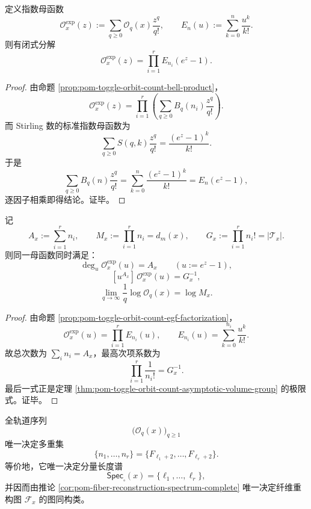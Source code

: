 \begin{proposition}[轨道指数母函数的截断指数分解]\label{prop:pom-toggle-orbit-count-egf-factorization}
定义指数母函数
\[
\mathcal O_x^{\exp}(z):=\sum_{q\ge 0}\mathcal O_q(x)\frac{z^q}{q!},
\qquad
E_n(u):=\sum_{k=0}^{n}\frac{u^k}{k!}.
\]
则有闭式分解
\[
\mathcal O_x^{\exp}(z)=\prod_{i=1}^r E_{n_i}(e^z-1).
\]
\end{proposition}

\begin{proof}
由命题 \ref{prop:pom-toggle-orbit-count-bell-product}，
\[
\mathcal O_x^{\exp}(z)
=
\prod_{i=1}^r\left(\sum_{q\ge 0}B_q(n_i)\frac{z^q}{q!}\right).
\]
而 Stirling 数的标准指数母函数为
\[
\sum_{q\ge 0}S(q,k)\frac{z^q}{q!}=\frac{(e^z-1)^k}{k!}.
\]
于是
\[
\sum_{q\ge 0}B_q(n)\frac{z^q}{q!}
=
\sum_{k=0}^{n}\frac{(e^z-1)^k}{k!}
=
E_n(e^z-1),
\]
逐因子相乘即得结论。证毕。
\end{proof}

\begin{corollary}\label{cor:pom-toggle-orbit-count-three-masses}
记
\[
A_x:=\sum_{i=1}^r n_i,
\qquad
M_x:=\prod_{i=1}^r n_i=d_m(x),
\qquad
G_x:=\prod_{i=1}^r n_i!=|\mathcal T_x|.
\]
则同一母函数同时满足：
\[
\deg_{u}\mathcal O_x^{\exp}(u)=A_x \qquad (u:=e^z-1),
\]
\[
[u^{A_x}]\,\mathcal O_x^{\exp}(u)=G_x^{-1},
\]
\[
\lim_{q\to\infty}\frac1q\log \mathcal O_q(x)=\log M_x.
\]
\end{corollary}

\begin{proof}
由命题 \ref{prop:pom-toggle-orbit-count-egf-factorization}，
\[
\mathcal O_x^{\exp}(u)=\prod_{i=1}^r E_{n_i}(u),
\qquad
E_{n_i}(u)=\sum_{k=0}^{n_i}\frac{u^k}{k!}.
\]
故总次数为 \(\sum_i n_i=A_x\)，最高次项系数为
\[
\prod_{i=1}^r \frac1{n_i!}=G_x^{-1}.
\]
最后一式正是定理 \ref{thm:pom-toggle-orbit-count-asymptotic-volume-group} 的极限式。证毕。
\end{proof}

\begin{conjecture}\label{conj:pom-toggle-orbit-count-complete-rigidity}
全轨道序列
\[
\bigl(\mathcal O_q(x)\bigr)_{q\ge 1}
\]
唯一决定多重集
\[
\{n_1,\dots,n_r\}
=
\{F_{\ell_1+2},\dots,F_{\ell_r+2}\}.
\]
等价地，它唯一决定分量长度谱
\[
\mathsf{Spec}_{\square}(x)=\{\ell_1,\dots,\ell_r\},
\]
并因而由推论 \ref{cor:pom-fiber-reconstruction-spectrum-complete} 唯一决定纤维重构图 \(\mathcal F_x\) 的图同构类。
\end{conjecture}

\endinput

